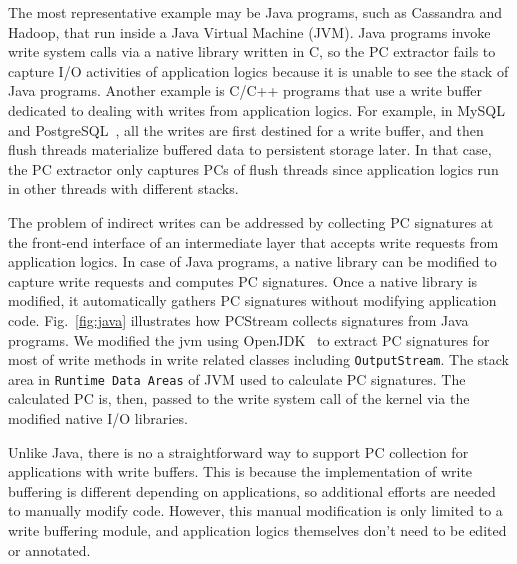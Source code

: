The most representative example may be Java programs, such as Cassandra and
Hadoop, that run inside a Java Virtual Machine (JVM). Java programs invoke
write system calls via a native library written in C, so the PC extractor fails
to capture I/O activities of application logics because it is unable to see the
stack of Java programs.  Another example is C/C++ programs that use a write
buffer dedicated to dealing with writes from application logics. For example,
in MySQL~\cite{MySQL} and PostgreSQL~\cite{PostgreSQL}, all the writes are first
destined for a write buffer, and then flush threads materialize buffered data
to persistent storage later.  In that case, the PC extractor only captures PCs
of flush threads since application logics run in other threads with different
stacks.

The problem of indirect writes can be addressed by collecting PC signatures at
the front-end interface of an intermediate layer that accepts write requests
from application logics. In case of Java programs, a native library can be
modified to capture write requests and computes PC signatures. Once a native
library is modified, it automatically gathers PC signatures without modifying
application code. Fig.~\ref{fig:java} illustrates how \textsf{PCStream}
collects signatures from Java programs.  
We modified the jvm using OpenJDK~\cite{OpenJDK} to extract PC signatures for 
most of write methods in write related classes including \texttt{OutputStream}.
The stack area in \texttt{Runtime Data Areas} of JVM used to calculate PC signatures.
The calculated PC is, then, passed to the write system call of the kernel via
the modified native I/O libraries.

Unlike Java, there is no a straightforward way to support PC collection for
applications with write buffers. This is because the implementation of write
buffering is different depending on applications, so additional efforts are
needed to manually modify code. However, this manual modification is only
limited to a write buffering module, and application logics themselves don't
need to be edited or annotated.


